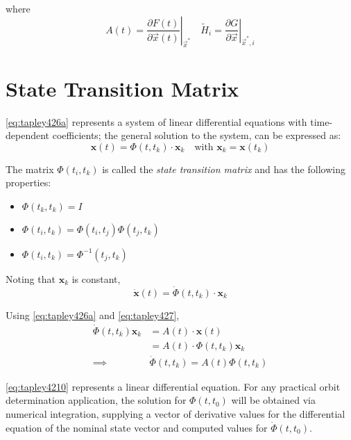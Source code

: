 where
\begin{equation}
	\label{eq:tapley426ah}
	A(t) = \left.\frac{\partial F(t)}{\partial \vec{x} (t)}\right|_{\vec{x}^*}
	\quad
	\tilde{H}_i = \left.\frac{\partial G}{\partial \vec{x}}\right|_{\vec{x}^* , i}
\end{equation}

\section{State Transition Matrix}
\ref{eq:tapley426a} represents a system of linear differential equations with time-dependent
coefficients; the general solution to the system, can be expressed as:
\begin{equation}
	\label{eq:tapley427}
	\bm{x}(t) = \Phi (t, t_k) \cdot \bm{x}_k \quad \text{with } \bm{x}_k = \bm{x}(t_k)
\end{equation}

The matrix \(\Phi (t_i, t_k) \) is called the \emph{state transition matrix} and has the
following properties:
\begin{itemize}
	\item \(\Phi (t_k, t_k) = I \)
	\item \(\Phi (t_i, t_k) = \Phi (t_i, t_j) \Phi (t_j, t_k) \)
	\item \(\Phi (t_i, t_k) = {\Phi}^{-1} (t_j, t_k) \)
\end{itemize}

Noting that \(\bm{x}_k\) is constant,
\begin{equation}
	\label{eq:tapley429}
	\bm{\dot{x}}(t) = \dot{\Phi} (t, t_k) \cdot \bm{x}_k
\end{equation}

Using \ref{eq:tapley426a} and \ref{eq:tapley427},
\begin{equation}
	\label{eq:tapley4210}
	\begin{aligned}
		\dot{\Phi} (t, t_k) \bm{x}_k & = A(t) \cdot \bm{x} (t) \\
		                             & = A(t) \cdot \Phi (t, t_k) \bm{x}_k \\
		\implies                     & \dot{\Phi} (t, t_k) = A(t) \Phi (t, t_k)
	\end{aligned}
\end{equation}

\ref{eq:tapley4210} represents a linear differential equation. For any practical orbit
determination application, the solution for \(\Phi (t, t_0)\)  will be obtained
via numerical integration, supplying a vector of derivative values for the differential
equation of the nominal state vector and computed values for \(\dot{\Phi} (t, t_0)\).


